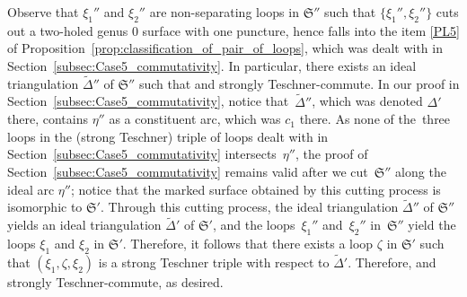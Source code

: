 \documentclass[pdftex]{sigma}
\numberwithin{equation}{section}
\theoremstyle{definition}
\newcommand{\til}[1]{\widetilde{#1}}
\begin{document}
Observe that $\xi_1''$ and $\xi_2''$ are non-separating loops in $\mathfrak{S}''$ such that $\{\xi_1'',\xi_2''\}$ cuts out a two-holed genus $0$ surface with one puncture, hence falls into the item \ref{PL5} of Proposition~\ref{prop:classification_of_pair_of_loops}, which was dealt with in Section~\ref{subsec:Case5_commutativity}. In particular, there exists an ideal triangulation $\widetilde{\Delta}''$ of $\mathfrak{S}''$ such that  and  strongly Teschner-commute. In our proof in Section~\ref{subsec:Case5_commutativity}, notice that~$\til{\Delta}''$, which was denoted $\Delta'$ there, contains $\eta''$ as a constituent arc, which was $c_1$ there. As none of the~three loops in the (strong Teschner) triple of loops dealt with in Section~\ref{subsec:Case5_commutativity} intersects~$\eta''$, the proof of Section~\ref{subsec:Case5_commutativity} remains valid after we cut~$\mathfrak{S}''$ along the ideal arc $\eta''$; notice that the marked surface obtained by this cutting process is isomorphic to $\mathfrak{S}'$. Through this cutting process, the ideal triangulation $\til{\Delta}''$ of $\mathfrak{S}''$ yields an ideal triangulation $\til{\Delta}'$ of $\mathfrak{S}'$, and the loops~$\xi_1''$ and~$\xi_2''$ in~$\mathfrak{S}''$ yield the loops $\xi_1$ and $\xi_2$ in $\mathfrak{S}'$. Therefore, it follows that there exists a loop $\zeta$ in $\mathfrak{S}'$ such that $(\xi_1,\zeta,\xi_2)$ is a strong Teschner triple with respect to $\til{\Delta}'$. Therefore, \smash{$f^\omega_{[\xi_1],\til{\Delta}'}$} and \smash{$f^\omega_{[\xi_2],\til{\Delta}'}$} strongly Teschner-commute, as desired.
\end{document}
